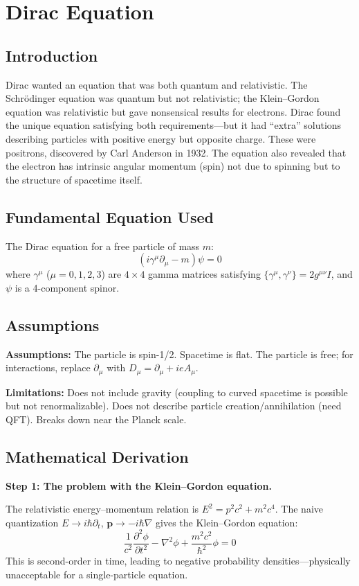 \chapter{Dirac Equation}

\section*{Introduction}

Dirac wanted an equation that was both quantum and relativistic. The Schr\"odinger equation was quantum but not relativistic; the Klein--Gordon equation was relativistic but gave nonsensical results for electrons. Dirac found the unique equation satisfying both requirements---but it had ``extra'' solutions describing particles with positive energy but opposite charge. These were positrons, discovered by Carl Anderson in 1932. The equation also revealed that the electron has intrinsic angular momentum (spin) not due to spinning but to the structure of spacetime itself.
\section*{Fundamental Equation Used}

The Dirac equation for a free particle of mass $m$:
\[
(i\gamma^\mu \partial_\mu - m)\psi = 0
\]
where $\gamma^\mu$ ($\mu = 0,1,2,3$) are $4\times 4$ gamma matrices satisfying $\{\gamma^\mu, \gamma^\nu\} = 2g^{\mu\nu}I$, and $\psi$ is a 4-component spinor.
\section*{Assumptions}

\textbf{Assumptions:} The particle is spin-1/2. Spacetime is flat. The particle is free; for interactions, replace $\partial_\mu$ with $D_\mu = \partial_\mu + ieA_\mu$.


\textbf{Limitations:} Does not include gravity (coupling to curved spacetime is possible but not renormalizable). Does not describe particle creation/annihilation (need QFT). Breaks down near the Planck scale.


\section*{Mathematical Derivation}

\textbf{Step 1: The problem with the Klein--Gordon equation.}

The relativistic energy--momentum relation is $E^2 = p^2c^2 + m^2c^4$. The naive quantization $E \to i\hbar\partial_t$, $\mathbf{p} \to -i\hbar\nabla$ gives the Klein--Gordon equation:
\begin{equation}
\frac{1}{c^2}\frac{\partial^2 \phi}{\partial t^2} - \nabla^2 \phi + \frac{m^2c^2}{\hbar^2}\phi = 0
\end{equation}
This is second-order in time, leading to negative probability densities---physically unacceptable for a single-particle equation.

